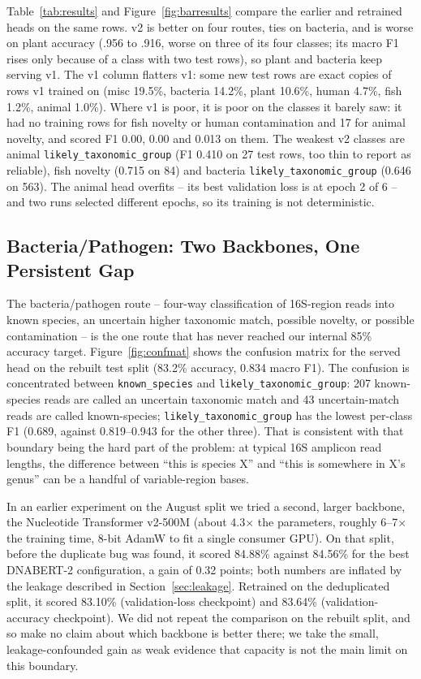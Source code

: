 \documentclass[conference]{IEEEtran}
\begin{document}
Table~\ref{tab:results} and Figure~\ref{fig:barresults} compare the earlier and retrained heads on the same rows. v2 is better on four routes, ties on bacteria, and is worse on plant accuracy (.956 to .916, worse on three of its four classes; its macro F1 rises only because of a class with two test rows), so plant and bacteria keep serving v1. The v1 column flatters v1: some new test rows are exact copies of rows v1 trained on (misc 19.5\%, bacteria 14.2\%, plant 10.6\%, human 4.7\%, fish 1.2\%, animal 1.0\%). Where v1 is poor, it is poor on the classes it barely saw: it had no training rows for fish novelty or human contamination and 17 for animal novelty, and scored F1 0.00, 0.00 and 0.013 on them. The weakest v2 classes are animal \texttt{likely\_taxonomic\_group} (F1 0.410 on 27 test rows, too thin to report as reliable), fish novelty (0.715 on 84) and bacteria \texttt{likely\_taxonomic\_group} (0.646 on 563). The animal head overfits -- its best validation loss is at epoch 2 of 6 -- and two runs selected different epochs, so its training is not deterministic.

\subsection{Bacteria/Pathogen: Two Backbones, One Persistent Gap}
\label{sec:bacteria}

The bacteria/pathogen route -- four-way classification of 16S-region reads into known species, an uncertain higher taxonomic match, possible novelty, or possible contamination -- is the one route that has never reached our internal 85\% accuracy target. Figure~\ref{fig:confmat} shows the confusion matrix for the served head on the rebuilt test split (83.2\% accuracy, 0.834 macro F1). The confusion is concentrated between \texttt{known\_species} and \texttt{likely\_taxonomic\_group}: 207 known-species reads are called an uncertain taxonomic match and 43 uncertain-match reads are called known-species; \texttt{likely\_taxonomic\_group} has the lowest per-class F1 (0.689, against 0.819--0.943 for the other three). That is consistent with that boundary being the hard part of the problem: at typical 16S amplicon read lengths, the difference between ``this is species X'' and ``this is somewhere in X's genus'' can be a handful of variable-region bases.

In an earlier experiment on the August split we tried a second, larger backbone, the Nucleotide Transformer v2-500M \cite{dallatorre2023nucleotide} (about 4.3$\times$ the parameters, roughly 6--7$\times$ the training time, 8-bit AdamW \cite{dettmers20228bit} to fit a single consumer GPU). On that split, before the duplicate bug was found, it scored 84.88\% against 84.56\% for the best DNABERT-2 configuration, a gain of 0.32 points; both numbers are inflated by the leakage described in Section~\ref{sec:leakage}. Retrained on the deduplicated split, it scored 83.10\% (validation-loss checkpoint) and 83.64\% (validation-accuracy checkpoint). We did not repeat the comparison on the rebuilt split, and so make no claim about which backbone is better there; we take the small, leakage-confounded gain as weak evidence that capacity is not the main limit on this boundary.
\end{document}
